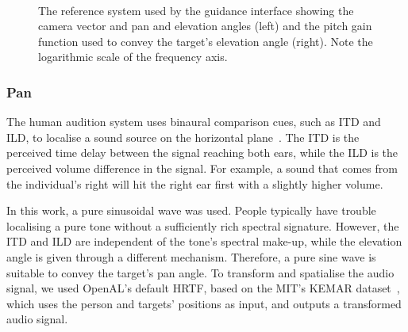 \documentclass{llncs}
\begin{document}
\begin{figure}[t]
  \centering
~
  \caption{The reference system used by the guidance interface showing the camera vector and pan and elevation angles (left) and the pitch gain function used to convey the target's elevation angle (right). Note the logarithmic scale of the frequency axis.}
\end{figure}

\subsubsection{Pan}

The human audition system uses binaural comparison cues, such as ITD and ILD, to localise a sound source on the horizontal plane~\cite{blauert1969sound}.
The ITD is the perceived time delay between the signal reaching both ears, while the ILD is the perceived volume difference in the signal.
For example, a sound that comes from the individual's right will hit the right ear first with a slightly higher volume.

In this work, a pure sinusoidal wave was used. 
People typically have trouble localising a pure tone without a sufficiently rich spectral signature.
However, the ITD and ILD are independent of the tone's spectral make-up, while the elevation angle is given through a different mechanism. Therefore, a pure sine wave is suitable to convey the target's pan angle.
To transform and spatialise the audio signal, we used OpenAL's default HRTF, based on the MIT's KEMAR dataset~\cite{hiebert2005openal}, which uses the person and targets' positions as input, and outputs a transformed audio signal.
\end{document}
